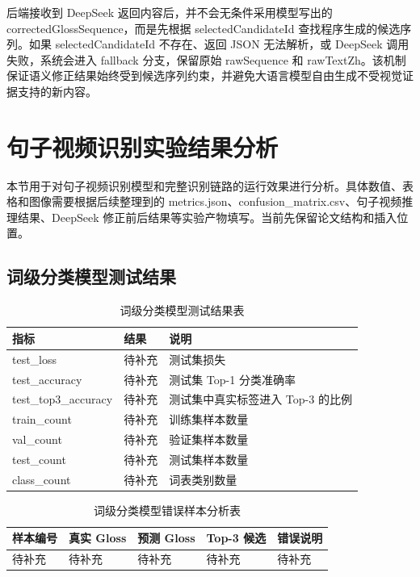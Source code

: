 后端接收到 DeepSeek 返回内容后，并不会无条件采用模型写出的 correctedGlossSequence，而是先根据 selectedCandidateId 查找程序生成的候选序列。如果 selectedCandidateId 不存在、返回 JSON 无法解析，或 DeepSeek 调用失败，系统会进入 fallback 分支，保留原始 rawSequence 和 rawTextZh。该机制保证语义修正结果始终受到候选序列约束，并避免大语言模型自由生成不受视觉证据支持的新内容。

\section{句子视频识别实验结果分析}

本节用于对句子视频识别模型和完整识别链路的运行效果进行分析。具体数值、表格和图像需要根据后续整理到的 metrics.json、confusion\_matrix.csv、句子视频推理结果、DeepSeek 修正前后结果等实验产物填写。当前先保留论文结构和插入位置。

\subsection{词级分类模型测试结果}

\begin{longtable}{L{0.24\textwidth} L{0.22\textwidth} L{0.44\textwidth}}
  \caption{词级分类模型测试结果表}
  \label{tab:chapter06-word-model-test-result}\\
  \toprule
  指标 & 结果 & 说明 \\
  \midrule
  test\_loss & 待补充 & 测试集损失 \\
  test\_accuracy & 待补充 & 测试集 Top-1 分类准确率 \\
  test\_top3\_accuracy & 待补充 & 测试集中真实标签进入 Top-3 的比例 \\
  train\_count & 待补充 & 训练集样本数量 \\
  val\_count & 待补充 & 验证集样本数量 \\
  test\_count & 待补充 & 测试集样本数量 \\
  class\_count & 待补充 & 词表类别数量 \\
  \bottomrule
\end{longtable}




\begin{longtable}{L{0.18\textwidth} L{0.18\textwidth} L{0.18\textwidth} L{0.26\textwidth} L{0.20\textwidth}}
  \caption{词级分类模型错误样本分析表}
  \label{tab:chapter06-word-model-error-analysis}\\
  \toprule
  样本编号 & 真实 Gloss & 预测 Gloss & Top-3 候选 & 错误说明 \\
  \midrule
  待补充 & 待补充 & 待补充 & 待补充 & 待补充 \\
  \bottomrule
\end{longtable}

